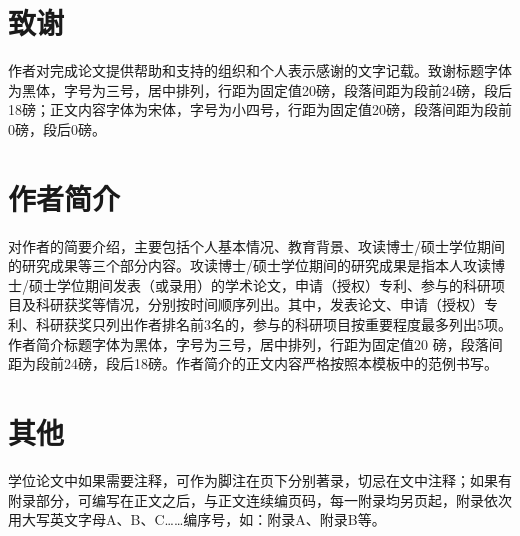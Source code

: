 \section{致谢}

作者对完成论文提供帮助和支持的组织和个人表示感谢的文字记载。致谢标题字体为黑体，字号为三号，居中排列，行距为固定值20磅，段落间距为段前24磅，段后18磅；正文内容字体为宋体，字号为小四号，行距为固定值20磅，段落间距为段前0磅，段后0磅。

\section{作者简介}

对作者的简要介绍，主要包括个人基本情况、教育背景、攻读博士/硕士学位期间的研究成果等三个部分内容。攻读博士/硕士学位期间的研究成果是指本人攻读博士/硕士学位期间发表（或录用）的学术论文，申请（授权）专利、参与的科研项目及科研获奖等情况，分别按时间顺序列出。其中，发表论文、申请（授权）专利、科研获奖只列出作者排名前3名的，参与的科研项目按重要程度最多列出5项。作者简介标题字体为黑体，字号为三号，居中排列，行距为固定值20 磅，段落间距为段前24磅，段后18磅。作者简介的正文内容严格按照本模板中的范例书写。

\section{其他}

学位论文中如果需要注释，可作为脚注在页下分别著录，切忌在文中注释；如果有附录部分，可编写在正文之后，与正文连续编页码，每一附录均另页起，附录依次用大写英文字母A、B、C……编序号，如：附录A、附录B等。
